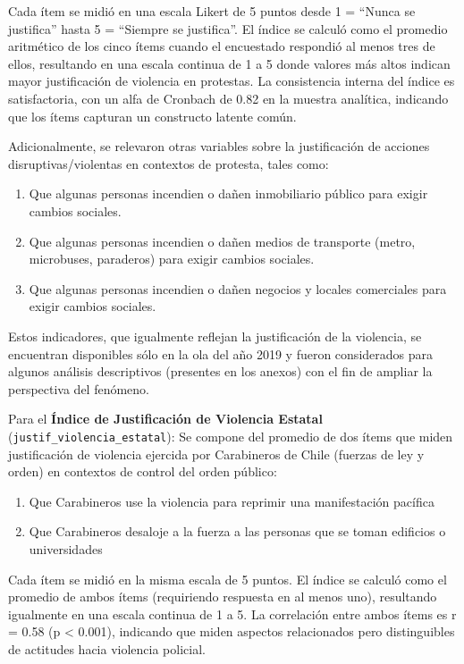 \documentclass[
  13pt,
]{article}
\providecommand{\tightlist}{%
  \setlength{\itemsep}{0pt}\setlength{\parskip}{0pt}}
\begin{document}
Cada ítem se midió en una escala Likert de 5 puntos desde 1 = ``Nunca se
justifica'' hasta 5 = ``Siempre se justifica''. El índice se calculó
como el promedio aritmético de los cinco ítems cuando el encuestado
respondió al menos tres de ellos, resultando en una escala continua de 1
a 5 donde valores más altos indican mayor justificación de violencia en
protestas. La consistencia interna del índice es satisfactoria, con un
alfa de Cronbach de 0.82 en la muestra analítica, indicando que los
ítems capturan un constructo latente común.

Adicionalmente, se relevaron otras variables sobre la justificación de
acciones disruptivas/violentas en contextos de protesta, tales como:

\begin{enumerate}
\def\labelenumi{\arabic{enumi}.}
\tightlist
\item
  Que algunas personas incendien o dañen inmobiliario público para
  exigir cambios sociales.
\item
  Que algunas personas incendien o dañen medios de transporte (metro,
  microbuses, paraderos) para exigir cambios sociales.
\item
  Que algunas personas incendien o dañen negocios y locales comerciales
  para exigir cambios sociales.
\end{enumerate}

Estos indicadores, que igualmente reflejan la justificación de la
violencia, se encuentran disponibles sólo en la ola del año 2019 y
fueron considerados para algunos análisis descriptivos (presentes en los
anexos) con el fin de ampliar la perspectiva del fenómeno.

Para el \textbf{Índice de Justificación de Violencia Estatal}
(\texttt{justif\_violencia\_estatal}): Se compone del promedio de dos
ítems que miden justificación de violencia ejercida por Carabineros de
Chile (fuerzas de ley y orden) en contextos de control del orden
público:

\begin{enumerate}
\def\labelenumi{\arabic{enumi}.}
\tightlist
\item
  Que Carabineros use la violencia para reprimir una manifestación
  pacífica
\item
  Que Carabineros desaloje a la fuerza a las personas que se toman
  edificios o universidades
\end{enumerate}

Cada ítem se midió en la misma escala de 5 puntos. El índice se calculó
como el promedio de ambos ítems (requiriendo respuesta en al menos uno),
resultando igualmente en una escala continua de 1 a 5. La correlación
entre ambos ítems es r = 0.58 (p \textless{} 0.001), indicando que miden
aspectos relacionados pero distinguibles de actitudes hacia violencia
policial.
\end{document}
